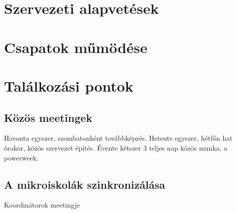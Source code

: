 \chapter{Szervezeti alapvetések}




\chapter{Csapatok műmödése}



\chapter{Találkozási pontok}
\section{Közös meetingek}
Havonta egyszer, szombatonként továbbképzés.
Hetente egyszer, hétfőn hat órakor, közös szervezet építés.
Évente kétszer 3 teljes nap közös munka, a powerweek.

\section{A mikroiskolák szinkronizálása}
Koordinátorok meetingje